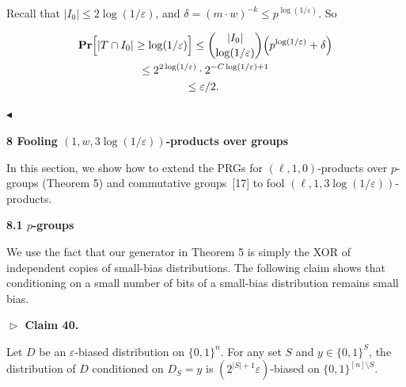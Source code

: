 Recall that $\lvert I_{0}\rvert\leq 2\log(1/\varepsilon)$, and $\delta=(m\cdot w)^{-k}\leq p^{\log(1/\varepsilon)}$.
So\par


\[\begin{gathered}
\displaystyle\mathop{\bf Pr\/}\Bigl{[}\lvert T\cap I_{0}\rvert\geq\log(1/\varepsilon)\Bigr{]} \displaystyle\leq\binom{\lvert I_{0}\rvert}{\log(1/\varepsilon)}\Bigl{(}p^{\log(1/\varepsilon)}+\delta\Bigr{)} \\
\displaystyle\leq 2^{2\log(1/\varepsilon)}\cdot 2^{-C\log(1/\varepsilon)+1} \\
\displaystyle\leq\varepsilon/2.\
\end{gathered}\]


$\blacktriangleleft$\par






\par\medskip\noindent\textbf{
8 Fooling $(1,w,3\log(1/\varepsilon))$-products over groups}\par




In this section, we show how to extend the PRGs for $(\ell,1,0)$-products over $p$-groups (Theorem 5) and commutative groups [17] to fool $(\ell,1,3\log(1/\varepsilon))$-products.\par




\par\medskip\noindent\textbf{
8.1 $p$-groups}\par




We use the fact that our generator in Theorem 5 is simply the XOR of independent copies of small-bias distributions.
The following claim shows that conditioning on a small number of bits of a small-bias distribution remains small bias.\par





\par\medskip\noindent\textbf{
$\vartriangleright$ Claim 40. }\par



Let $D$ be an $\varepsilon$-biased distribution on $\{0,1\}^{n}$.
For any set $S$ and $y\in\{0,1\}^{S}$, the distribution of $D$ conditioned on $D_{S}=y$ is $(2^{\lvert S\rvert+1}\varepsilon)$-biased on $\{0,1\}^{[n]\setminus S}$.\par



